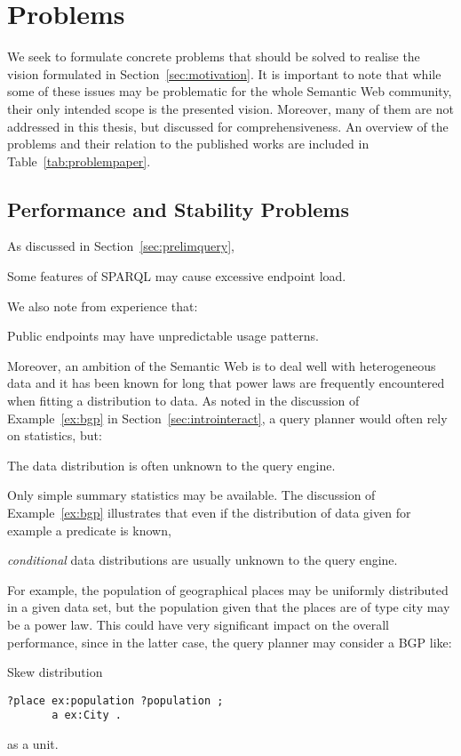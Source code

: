 \section{Problems}\label{sec:problems}

We seek to formulate concrete problems that should be solved to
realise the vision formulated in Section~\ref{sec:motivation}. It is
important to note that while some of these issues may be problematic
for the whole Semantic Web community, their only intended scope is the
presented vision. Moreover, many of them are not addressed in this
thesis, but discussed for comprehensiveness. An overview of the
problems and their relation to the published works are included in
Table~\ref{tab:problempaper}.

\subsection{Performance and Stability Problems}\label{sec:perfproblems}

As discussed in Section~\ref{sec:prelimquery}, 

\begin{problem}\label{prob:sparqlcomplex}
Some features of SPARQL may cause excessive endpoint load.
\end{problem}

We also note from experience that:

\begin{problem}\label{prob:endpointunpred}
Public endpoints may have unpredictable usage patterns.
\end{problem}

Moreover, an ambition of the Semantic Web is to deal well with
heterogeneous data and it has been known for long \cite{1385469} that
power laws are frequently encountered when fitting a distribution to
data. As noted in the discussion of Example~\ref{ex:bgp} in
Section~\ref{sec:introinteract}, a query planner would often rely on
statistics, but:

\begin{problem}\label{prob:unknowndist}
The data distribution is often unknown to the query engine.
\end{problem}
Only simple summary statistics may be available. The discussion of
Example~\ref{ex:bgp} illustrates that even if the distribution of data
given for example a predicate is known, 
\begin{problem}\label{prob:unknownconddist}
\emph{conditional} data distributions are usually unknown to the query engine.
\end{problem}
For example, the population of geographical places may be uniformly
distributed in a given data set, but the population given that the
places are of type city may be a power law. This could have very
significant impact on the overall performance, since in the latter
case, the query planner may consider a BGP like:
\begin{example}{Skew distribution}
\begin{verbatim}
?place ex:population ?population ;
       a ex:City .
\end{verbatim}
\end{example}
as a unit.

